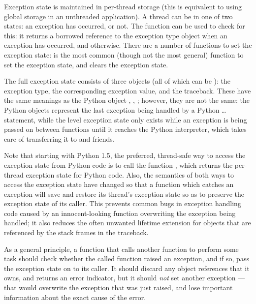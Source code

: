 \documentclass{manual}
\begin{document}
Exception state is maintained in per-thread storage (this is 
equivalent to using global storage in an unthreaded application).  A 
thread can be in one of two states: an exception has occurred, or not.
The function  can be used to check for
this: it returns a borrowed reference to the exception type object
when an exception has occurred, and \NULL{} otherwise.  There are a
number of functions to set the exception state:
 is the most common (though not the most
general) function to set the exception state, and
 clears the exception state.

The full exception state consists of three objects (all of which can 
be \NULL{}): the exception type, the corresponding exception 
value, and the traceback.  These have the same meanings as the Python 
object , , 
; however, they are not the same: the Python 
objects represent the last exception being handled by a Python 
 \ldots\  statement, while the \C{} level
exception state only exists while an exception is being passed on
between \C{} functions until it reaches the Python interpreter, which
takes care of transferring it to  and friends.

Note that starting with Python 1.5, the preferred, thread-safe way to 
access the exception state from Python code is to call the function 
, which returns the per-thread exception state 
for Python code.  Also, the semantics of both ways to access the 
exception state have changed so that a function which catches an 
exception will save and restore its thread's exception state so as to 
preserve the exception state of its caller.  This prevents common bugs 
in exception handling code caused by an innocent-looking function 
overwriting the exception being handled; it also reduces the often 
unwanted lifetime extension for objects that are referenced by the 
stack frames in the traceback.

As a general principle, a function that calls another function to 
perform some task should check whether the called function raised an 
exception, and if so, pass the exception state on to its caller.  It 
should discard any object references that it owns, and returns an 
error indicator, but it should \emph{not} set another exception ---
that would overwrite the exception that was just raised, and lose
important information about the exact cause of the error.
\end{document}
